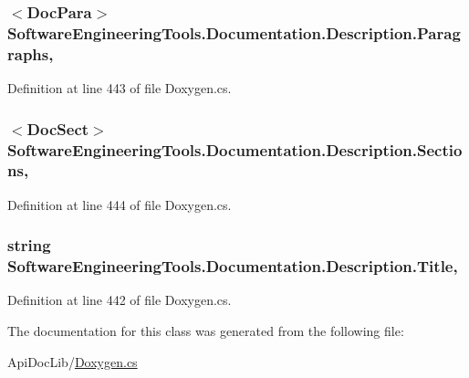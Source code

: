 \hypertarget{class_software_engineering_tools_1_1_documentation_1_1_description_aac9bd87b495aeecf95fe6b696f929cae}{
\subsubsection[{Paragraphs}]{$<${\bf Doc\+Para}$>$ Software\+Engineering\+Tools.\+Documentation.\+Description.\+Paragraphs\hspace{0.3cm}{\ttfamily [get]}, {\ttfamily [set]}}}\label{class_software_engineering_tools_1_1_documentation_1_1_description_aac9bd87b495aeecf95fe6b696f929cae}


Definition at line 443 of file Doxygen.\+cs.

\hypertarget{class_software_engineering_tools_1_1_documentation_1_1_description_a77b76a6eb0dde987ea3b919ccd094a25}{
\subsubsection[{Sections}]{$<${\bf Doc\+Sect}$>$ Software\+Engineering\+Tools.\+Documentation.\+Description.\+Sections\hspace{0.3cm}{\ttfamily [get]}, {\ttfamily [set]}}}\label{class_software_engineering_tools_1_1_documentation_1_1_description_a77b76a6eb0dde987ea3b919ccd094a25}


Definition at line 444 of file Doxygen.\+cs.

\hypertarget{class_software_engineering_tools_1_1_documentation_1_1_description_a037f99f3a2542aac9a84a820934c3134}{
\subsubsection[{Title}]{\setlength{\rightskip}{0pt plus 5cm}string Software\+Engineering\+Tools.\+Documentation.\+Description.\+Title\hspace{0.3cm}{\ttfamily [get]}, {\ttfamily [set]}}}\label{class_software_engineering_tools_1_1_documentation_1_1_description_a037f99f3a2542aac9a84a820934c3134}


Definition at line 442 of file Doxygen.\+cs.



The documentation for this class was generated from the following file\+:\begin{DoxyCompactItemize}
\item 
Api\+Doc\+Lib/\hyperlink{_doxygen_8cs}{Doxygen.\+cs}\end{DoxyCompactItemize}
